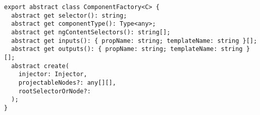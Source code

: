 \begin{verbatim}
export abstract class ComponentFactory<C> {
  abstract get selector(): string;
  abstract get componentType(): Type<any>;
  abstract get ngContentSelectors(): string[];
  abstract get inputs(): { propName: string; templateName: string }[];
  abstract get outputs(): { propName: string; templateName: string }[];
  abstract create(
    injector: Injector,
    projectableNodes?: any[][],
    rootSelectorOrNode?:
  );
}
\end{verbatim}
